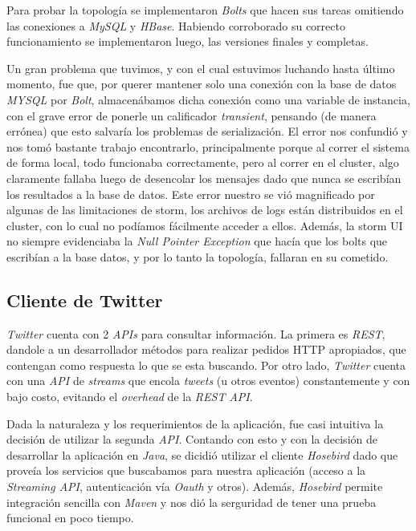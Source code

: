 \documentclass[a4paper,10pt]{article}
\begin{document}
Para probar la topología se implementaron \textit{Bolts} que hacen sus tareas omitiendo las conexiones a \textit{MySQL} y \textit{HBase}.
Habiendo corroborado su correcto funcionamiento se implementaron luego, las versiones finales y completas.

Un gran problema que tuvimos, y con el cual estuvimos luchando hasta último momento, fue que, por querer mantener solo una conexión con la base de datos \textit{MYSQL} por 
\textit{Bolt}, almacenábamos dicha conexión como una variable de instancia, con el grave error de ponerle un calificador \textit{transient}, pensando (de manera errónea) que esto
salvaría los problemas de serialización. El error nos confundió y nos tomó bastante trabajo encontrarlo, principalmente porque al correr el sistema de forma local, todo 
funcionaba correctamente, pero al correr en el cluster, algo claramente fallaba luego de desencolar los mensajes dado que nunca se escribían los resultados a la base de datos.
Este error nuestro se vió magnificado por algunas de las limitaciones de storm, los archivos de logs están distribuidos en el cluster, con lo cual no podíamos fácilmente acceder
a ellos. Además, la storm UI no siempre evidenciaba la \textit{Null Pointer Exception} que hacía que los bolts que escribían a la base datos, y por lo tanto la topología, 
fallaran en su cometido.

\subsection{Cliente de Twitter}

\textit{Twitter} cuenta con 2 \textit{APIs} para consultar información. La primera es \textit{REST}, dandole a un desarrollador métodos para realizar pedidos HTTP apropiados,
que contengan como respuesta lo que se esta buscando. Por otro lado, \textit{Twitter} cuenta con una \textit{API} de \textit{streams} que encola \textit{tweets} (u otros eventos)
constantemente y con bajo costo, evitando el \textit{overhead} de la \textit{REST API}.

Dada la naturaleza y los requerimientos de la aplicación, fue casi intuitiva la decisión de utilizar la segunda \textit{API}. Contando con esto y con la decisión de desarrollar
la aplicación en \textit{Java}, se dicidió utilizar el cliente \textit{Hosebird} dado que proveía los servicios que buscabamos para nuestra aplicación (acceso a la
\textit{Streaming API}, autenticación vía \textit{Oauth} y otros). Además, \textit{Hosebird} permite integración sencilla con \textit{Maven} y nos dió la serguridad de tener
una prueba funcional en poco tiempo.
\end{document}
